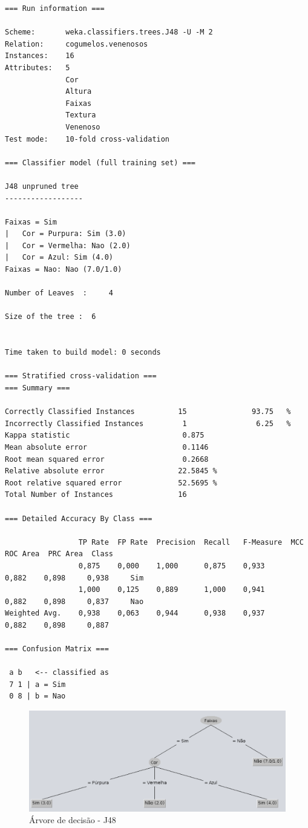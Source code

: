 \documentclass[
    article,            %
    11pt,               %
    oneside,            %
    a4paper,            %
    english,            %
    brazil,             %
    sumario=tradicional,
    ]{abntex2}
\begin{document}
\begin{Verbatim}[frame=single, fontsize=\tiny]
=== Run information ===

Scheme:       weka.classifiers.trees.J48 -U -M 2
Relation:     cogumelos.venenosos
Instances:    16
Attributes:   5
              Cor
              Altura
              Faixas
              Textura
              Venenoso
Test mode:    10-fold cross-validation

=== Classifier model (full training set) ===

J48 unpruned tree
------------------

Faixas = Sim
|   Cor = Purpura: Sim (3.0)
|   Cor = Vermelha: Nao (2.0)
|   Cor = Azul: Sim (4.0)
Faixas = Nao: Nao (7.0/1.0)

Number of Leaves  :     4

Size of the tree :  6


Time taken to build model: 0 seconds

=== Stratified cross-validation ===
=== Summary ===

Correctly Classified Instances          15               93.75   %
Incorrectly Classified Instances         1                6.25   %
Kappa statistic                          0.875 
Mean absolute error                      0.1146
Root mean squared error                  0.2668
Relative absolute error                 22.5845 %
Root relative squared error             52.5695 %
Total Number of Instances               16     

=== Detailed Accuracy By Class ===

                 TP Rate  FP Rate  Precision  Recall   F-Measure  MCC      ROC Area  PRC Area  Class
                 0,875    0,000    1,000      0,875    0,933      0,882    0,898     0,938     Sim
                 1,000    0,125    0,889      1,000    0,941      0,882    0,898     0,837     Nao
Weighted Avg.    0,938    0,063    0,944      0,938    0,937      0,882    0,898     0,887     

=== Confusion Matrix ===

 a b   <-- classified as
 7 1 | a = Sim
 0 8 | b = Nao
\end{Verbatim}

    \begin{figure}[H]
        \label{j48-decision-tree}
        \caption{Árvore de decisão - J48}
        \includegraphics[width=\textwidth]{imgs/exer2-j48-tree.pdf}
    \end{figure}
\end{document}
